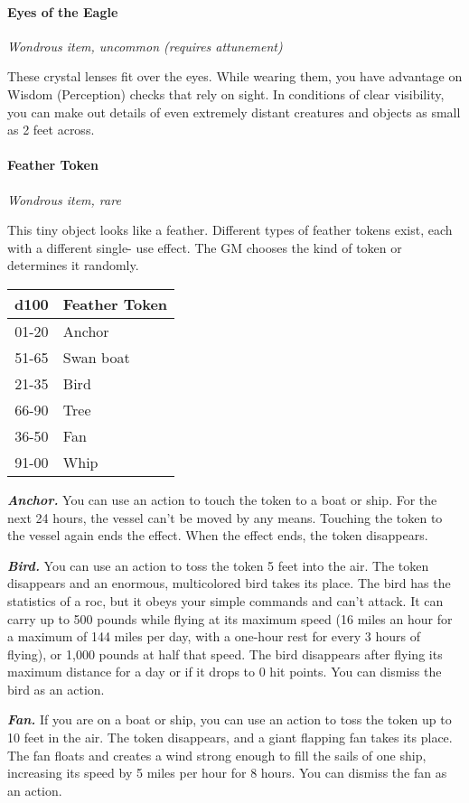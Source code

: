 \documentclass[
]{article}
\begin{document}
\hypertarget{eyes-of-the-eagle}{%
\paragraph{Eyes of the Eagle}\label{eyes-of-the-eagle}}

\emph{Wondrous item, uncommon (requires attunement)}

These crystal lenses fit over the eyes. While wearing them, you have
advantage on Wisdom (Perception) checks that rely on sight. In
conditions of clear visibility, you can make out details of even
extremely distant creatures and objects as small as 2 feet across.

\hypertarget{feather-token}{%
\paragraph{Feather Token}\label{feather-token}}

\emph{Wondrous item, rare}

This tiny object looks like a feather. Different types of feather tokens
exist, each with a different single- use effect. The GM chooses the kind
of token or determines it randomly.

\begin{longtable}[]{@{}cl@{}}
\toprule
d100 & Feather Token\tabularnewline
\midrule
\endhead
01-20 & Anchor\tabularnewline
51-65 & Swan boat\tabularnewline
21-35 & Bird\tabularnewline
66-90 & Tree\tabularnewline
36-50 & Fan\tabularnewline
91-00 & Whip\tabularnewline
\bottomrule
\end{longtable}

\emph{\textbf{Anchor.}} You can use an action to touch the token to a
boat or ship. For the next 24 hours, the vessel can't be moved by any
means. Touching the token to the vessel again ends the effect. When the
effect ends, the token disappears.

\emph{\textbf{Bird.}} You can use an action to toss the token 5 feet
into the air. The token disappears and an enormous, multicolored bird
takes its place. The bird has the statistics of a roc, but it obeys your
simple commands and can't attack. It can carry up to 500 pounds while
flying at its maximum speed (16 miles an hour for a maximum of 144 miles
per day, with a one-hour rest for every 3 hours of flying), or 1,000
pounds at half that speed. The bird disappears after flying its maximum
distance for a day or if it drops to 0 hit points. You can dismiss the
bird as an action.

\emph{\textbf{Fan.}} If you are on a boat or ship, you can use an action
to toss the token up to 10 feet in the air. The token disappears, and a
giant flapping fan takes its place. The fan floats and creates a wind
strong enough to fill the sails of one ship, increasing its speed by 5
miles per hour for 8 hours. You can dismiss the fan as an action.
\end{document}
